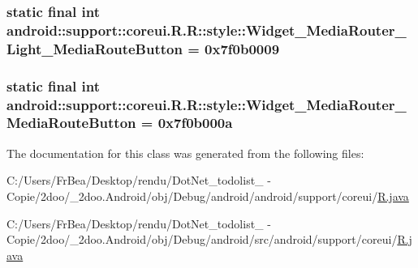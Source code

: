\hypertarget{classandroid_1_1support_1_1coreui_1_1_r_1_1style_682025ac07c8b2e672eaa2a56d27b0cf}{
\subsubsection[{Widget\_\-MediaRouter\_\-Light\_\-MediaRouteButton}]{\setlength{\rightskip}{0pt plus 5cm}static final int android::support::coreui.R.R::style::Widget\_\-MediaRouter\_\-Light\_\-MediaRouteButton = 0x7f0b0009}}
\label{classandroid_1_1support_1_1coreui_1_1_r_1_1style_682025ac07c8b2e672eaa2a56d27b0cf}


\hypertarget{classandroid_1_1support_1_1coreui_1_1_r_1_1style_ea11140badf9bc1b51086df66fcf04c8}{
\subsubsection[{Widget\_\-MediaRouter\_\-MediaRouteButton}]{\setlength{\rightskip}{0pt plus 5cm}static final int android::support::coreui.R.R::style::Widget\_\-MediaRouter\_\-MediaRouteButton = 0x7f0b000a}}
\label{classandroid_1_1support_1_1coreui_1_1_r_1_1style_ea11140badf9bc1b51086df66fcf04c8}




The documentation for this class was generated from the following files:\begin{CompactItemize}
\item 
C:/Users/FrBea/Desktop/rendu/DotNet\_\-todolist\_ - Copie/2doo/\_\-2doo.Android/obj/Debug/android/android/support/coreui/\hyperlink{android_2support_2coreui_2_r_8java}{R.java}\item 
C:/Users/FrBea/Desktop/rendu/DotNet\_\-todolist\_ - Copie/2doo/\_\-2doo.Android/obj/Debug/android/src/android/support/coreui/\hyperlink{src_2android_2support_2coreui_2_r_8java}{R.java}\end{CompactItemize}
